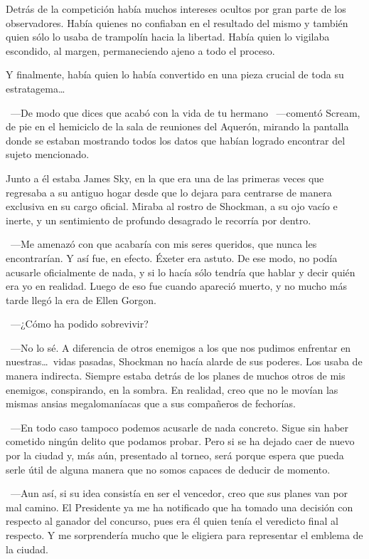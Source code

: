 Detrás de la competición había muchos intereses ocultos por gran parte de los observadores. Había quienes no confiaban en el resultado del mismo y también quien sólo lo usaba de trampolín hacia la libertad. Había quien lo vigilaba escondido, al margen, permaneciendo ajeno a todo el proceso.

Y finalmente, había quien lo había convertido en una pieza crucial de toda su estratagema\dots

\fancyparbreak
~---De modo que dices que acabó con la vida de tu hermano ~---comentó Scream, de pie en el hemiciclo de la sala de reuniones del Aquerón, mirando la pantalla donde se estaban mostrando todos los datos que habían logrado encontrar del sujeto mencionado.

Junto a él estaba James Sky, en la que era una de las primeras veces que regresaba a su antiguo hogar desde que lo dejara para centrarse de manera exclusiva en su cargo oficial. Miraba al rostro de Shockman, a su ojo vacío e inerte, y un sentimiento de profundo desagrado le recorría por dentro.

~---Me amenazó con que acabaría con mis seres queridos, que nunca les encontrarían. Y así fue, en efecto. Éxeter era astuto. De ese modo, no podía acusarle oficialmente de nada, y si lo hacía sólo tendría que hablar y decir quién era yo en realidad. Luego de eso fue cuando apareció muerto, y no mucho más tarde llegó la era de Ellen Gorgon.

~---¿Cómo ha podido sobrevivir?

~---No lo sé. A diferencia de otros enemigos a los que nos pudimos enfrentar en nuestras\dots\ vidas pasadas, Shockman no hacía alarde de sus poderes. Los usaba de manera indirecta. Siempre estaba detrás de los planes de muchos otros de mis enemigos, conspirando, en la sombra. En realidad, creo que no le movían las mismas ansias megalomaníacas que a sus compañeros de fechorías.

~---En todo caso tampoco podemos acusarle de nada concreto. Sigue sin haber cometido ningún delito que podamos probar. Pero si se ha dejado caer de nuevo por la ciudad y, más aún, presentado al torneo, será porque espera que pueda serle útil de alguna manera que no somos capaces de deducir de momento.

~---Aun así, si su idea consistía en ser el vencedor, creo que sus planes van por mal camino. El Presidente ya me ha notificado que ha tomado una decisión con respecto al ganador del concurso, pues era él quien tenía el veredicto final al respecto. Y me sorprendería mucho que le eligiera para representar el emblema de la ciudad.

